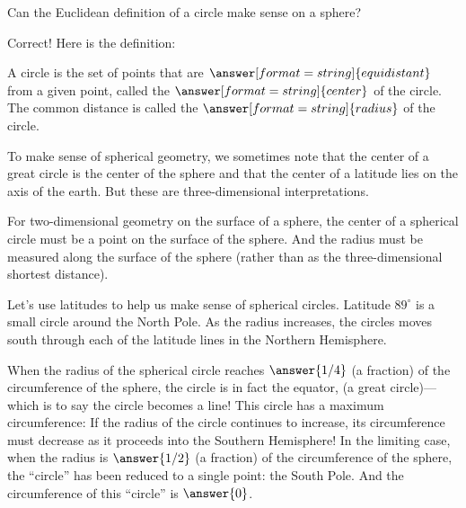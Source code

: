 \documentclass{ximera}
\begin{document}
\begin{problem}
Can the Euclidean definition of a circle make sense on a sphere?  
\begin{multipleChoice}
\end{multipleChoice}
\begin{problem}
Correct! Here is the definition:  

A circle is the set of points that are $\answer[format=string]{equidistant}$ from a given point, called the $\answer[format=string]{center}$ of the circle.  The common distance is called the $\answer[format=string]{radius}$ of the circle.  
\begin{problem}
To make sense of spherical geometry, we sometimes note that the center of a great circle is the center of the sphere and that the center of a latitude lies on the axis of the earth.  But these are three-dimensional interpretations. 

For two-dimensional geometry on the surface of a sphere, the center of a spherical circle must be a point on the surface of the sphere.  And the radius must be measured along the surface of the sphere (rather than as the three-dimensional shortest distance). 

Let's use latitudes to help us make sense of spherical circles.  Latitude $89^\circ$ is a small circle around the North Pole.  As the radius increases, the circles moves south through each of the latitude lines in the Northern Hemisphere.  

When the radius of the spherical circle reaches $\answer{1/4}$ (a fraction) of the circumference of the sphere, the circle is in fact the equator, (a great circle)---which is to say the circle becomes a line!   This circle has a maximum circumference:  If the radius of the circle continues to increase, its circumference must decrease as it proceeds into the Southern Hemisphere!  In the limiting case, when the radius is $\answer{1/2}$ (a fraction) of the circumference of the sphere, the ``circle'' has been reduced to a single point:  the South Pole.  And the circumference of this ``circle'' is $\answer{0}$. 
\end{problem}
\end{problem}
\end{problem}



\end{document}
